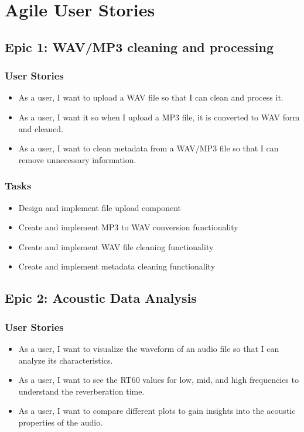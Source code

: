 \documentclass[11pt]{article}
\begin{document}
\section{Agile User Stories}
\subsection{Epic 1: WAV/MP3 cleaning and processing}

\subsubsection{User Stories}
\begin{itemize}
    \item As a user, I want to upload a WAV file so that I can clean and process it.
    \item As a user, I want it so when I upload a MP3 file, it is converted to WAV form and cleaned.
    \item As a user, I want to clean metadata from a WAV/MP3 file so that I can remove unnecessary information.
\end{itemize}

\subsubsection{Tasks}
\begin{itemize}
    \item Design and implement file upload component
    \item Create and implement MP3 to WAV conversion functionality
    \item Create and implement WAV file cleaning functionality
    \item Create and implement metadata cleaning functionality
\end{itemize}

\subsection{Epic 2: Acoustic Data Analysis}

\subsubsection{User Stories}
\begin{itemize}
    \item As a user, I want to visualize the waveform of an audio file so that I can analyze its characteristics.
    \item As a user, I want to see the RT60 values for low, mid, and high frequencies to understand the reverberation time.
    \item As a user, I want to compare different plots to gain insights into the acoustic properties of the audio.
\end{itemize}
\end{document}
